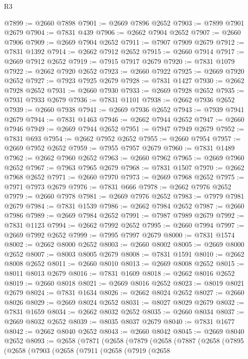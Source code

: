 \begin{lexlean}{R3}
\begin{coremodule}
@7899 := @2660 @7898
@7901 := @2669 @7896 @2652
@7903 := @7899 @7901 @2679
@7904 := @7831 @439
@7906 := @2662 @7904 @2652
@7907 := @2660 @7906
@7909 := @2669 @7904 @2652
@7911 := @7907 @7909 @2679
@7912 := @7831 @1392
@7914 := @2662 @7912 @2652
@7915 := @2660 @7914
@7917 := @2669 @7912 @2652
@7919 := @7915 @7917 @2679
@7920 := @7831 @1079
@7922 := @2662 @7920 @2652
@7923 := @2660 @7922
@7925 := @2669 @7920 @2652
@7927 := @7923 @7925 @2679
@7928 := @7831 @1427
@7930 := @2662 @7928 @2652
@7931 := @2660 @7930
@7933 := @2669 @7928 @2652
@7935 := @7931 @7933 @2679
@7936 := @7831 @1101
@7938 := @2662 @7936 @2652
@7939 := @2660 @7938
@7941 := @2669 @7936 @2652
@7943 := @7939 @7941 @2679
@7944 := @7831 @1463
@7946 := @2662 @7944 @2652
@7947 := @2660 @7946
@7949 := @2669 @7944 @2652
@7951 := @7947 @7949 @2679
@7952 := @7831 @693
@7954 := @2662 @7952 @2652
@7955 := @2660 @7954
@7957 := @2669 @7952 @2652
@7959 := @7955 @7957 @2679
@7960 := @7831 @1489
@7962 := @2662 @7960 @2652
@7963 := @2660 @7962
@7965 := @2669 @7960 @2652
@7967 := @7963 @7965 @2679
@7968 := @7831 @1507
@7970 := @2662 @7968 @2652
@7971 := @2660 @7970
@7973 := @2669 @7968 @2652
@7975 := @7971 @7973 @2679
@7976 := @7831 @666
@7978 := @2662 @7976 @2652
@7979 := @2660 @7978
@7981 := @2669 @7976 @2652
@7983 := @7979 @7981 @2679
@7984 := @7831 @1539
@7986 := @2662 @7984 @2652
@7987 := @2660 @7986
@7989 := @2669 @7984 @2652
@7991 := @7987 @7989 @2679
@7992 := @7831 @1123
@7994 := @2662 @7992 @2652
@7995 := @2660 @7994
@7997 := @2669 @7992 @2652
@7999 := @7995 @7997 @2679
@8000 := @7831 @1574
@8002 := @2662 @8000 @2652
@8003 := @2660 @8002
@8005 := @2669 @8000 @2652
@8007 := @8003 @8005 @2679
@8008 := @7831 @1591
@8010 := @2662 @8008 @2652
@8011 := @2660 @8010
@8013 := @2669 @8008 @2652
@8015 := @8011 @8013 @2679
@8016 := @7831 @1609
@8018 := @2662 @8016 @2652
@8019 := @2660 @8018
@8021 := @2669 @8016 @2652
@8023 := @8019 @8021 @2679
@8024 := @7831 @1634
@8026 := @2662 @8024 @2652
@8027 := @2660 @8026
@8029 := @2669 @8024 @2652
@8031 := @8027 @8029 @2679
@8032 := @7831 @1659
@8034 := @2662 @8032 @2652
@8035 := @2660 @8034
@8037 := @2669 @8032 @2652
@8039 := @8035 @8037 @2679
@8040 := @7831 @1677
@8042 := @2662 @8040 @2652
@8043 := @2660 @8042
@8045 := @2669 @8040 @2652
@8093 := @2658
    (@7871
      (@2658
        (@7879
          (@2658
            (@7887
              (@2658
                (@7895
                  (@2658
                    (@7903
                      (@2658
                        (@7911
                          (@2658
                            (@7919
                              (@2658

\end{coremodule}
\end{lexlean}
